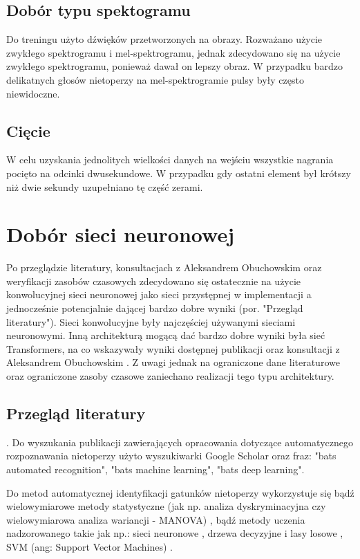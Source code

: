 \documentclass{sprz}
\begin{document}
\subsection{Dobór typu spektogramu}
Do treningu użyto dźwięków przetworzonych na obrazy. Rozważano użycie zwykłego spektrogramu i mel-spektrogramu, jednak zdecydowano się na użycie zwykłego spektrogramu, ponieważ dawał on lepszy obraz. W przypadku bardzo delikatnych głosów nietoperzy na mel-spektrogramie pulsy były często niewidoczne.

\subsection{Cięcie}
W celu uzyskania jednolitych wielkości danych na wejściu wszystkie nagrania pocięto na odcinki dwusekundowe. W przypadku gdy ostatni element był krótszy niż dwie sekundy uzupełniano tę część zerami.

\section{Dobór sieci neuronowej}
Po przeglądzie literatury, konsultacjach z Aleksandrem Obuchowskim oraz weryfikacji zasobów czasowych zdecydowano się ostatecznie na użycie konwolucyjnej sieci neuronowej jako sieci przystępnej w implementacji a jednocześnie potencjalnie dającej bardzo dobre wyniki (por. "Przegląd literatury"). Sieci konwolucyjne były najczęściej używanymi sieciami neuronowymi. Inną architekturą mogącą dać bardzo dobre wyniki była sieć Transformers, na co wskazywały wyniki dostępnej publikacji oraz konsultacji z Aleksandrem Obuchowskim \cite{bats-transformers}. Z uwagi jednak na ograniczone dane literaturowe oraz ograniczone zasoby czasowe zaniechano realizacji tego typu architektury.

\subsection{Przegląd literatury}.
Do wyszukania publikacji zawierających opracowania dotyczące automatycznego rozpoznawania nietoperzy użyto wyszukiwarki Google Scholar oraz fraz: "bats automated recognition", "bats machine learning", "bats deep learning".

Do metod automatycznej identyfikacji gatunków nietoperzy wykorzystuje się
bądź wielowymiarowe metody statystyczne (jak np. analiza dyskryminacyjna czy wielowymiarowa analiza wariancji - MANOVA) \cite{bats-id-statistics}, bądź metody uczenia nadzorowanego \cite{bats-id-supervised} takie jak np.: sieci neuronowe \cite{bats-id-nn}, drzewa decyzyjne i lasy losowe \cite{bats-random-forest}, SVM (ang: Support Vector Machines) \cite{bats-id-svm}.
\end{document}
